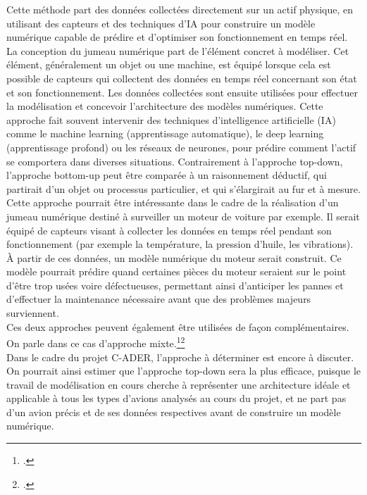 Cette méthode part des données collectées directement sur un actif physique, en utilisant des capteurs et des techniques d'IA pour construire un modèle numérique capable de prédire et d'optimiser son fonctionnement en temps réel. La conception du jumeau numérique part de l'élément concret à modéliser. Cet élément, généralement un objet ou une machine, est équipé lorsque cela est possible de capteurs qui collectent des données en temps réel concernant son état et son fonctionnement. Les données collectées sont ensuite utilisées pour effectuer la modélisation et concevoir l’architecture des modèles numériques. Cette approche fait souvent intervenir des techniques d'intelligence artificielle (IA) comme le machine learning (apprentissage automatique), le deep learning (apprentissage profond) ou les réseaux de neurones, pour prédire comment l’actif se comportera dans diverses situations. Contrairement à l’approche top-down, l’approche bottom-up peut être comparée à un raisonnement déductif, qui partirait d’un objet ou processus particulier, et qui s'élargirait au fur et à mesure.\\

Cette approche pourrait être intéressante dans le cadre de la réalisation d’un jumeau numérique destiné à surveiller un moteur de voiture par exemple. Il serait équipé de capteurs visant à collecter les données en temps réel pendant son fonctionnement (par exemple la température, la pression d’huile, les vibrations). À partir de ces données, un modèle numérique du moteur serait construit. Ce modèle pourrait prédire quand certaines pièces du moteur seraient sur le point d’être trop usées voire défectueuses, permettant ainsi d’anticiper les pannes et d'effectuer la maintenance nécessaire avant que des problèmes majeurs surviennent.\\

Ces deux approches peuvent également être utilisées de façon complémentaires. On parle dans ce cas d’approche mixte.\footcite{bealJumeauNumeriqueRealite}\footcite{garcia-monteroJumeauNumeriqueQu2023}\\

Dans le cadre du projet C-ADER, l’approche à déterminer est encore à discuter. On pourrait ainsi estimer que l’approche top-down sera la plus efficace, puisque le travail de modélisation en cours cherche à représenter une architecture idéale et applicable à tous les types d’avions analysés au cours du projet, et ne part pas d’un avion précis et de ses données respectives avant de construire un modèle numérique.

